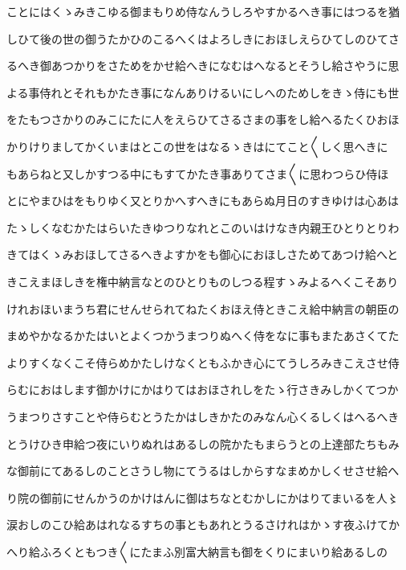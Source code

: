 \documentclass[a4paper,11pt,landscape]{ltjtarticle}
\begin{document}
\par\medskip
ことにはくゝみきこゆる御まもりめ侍なんうしろやすかるへき事にはつるを猶
\par\medskip
しひて後の世の御うたかひのこるへくはよろしきにおほしえらひてしのひてさ
\par\medskip
るへき御あつかりをさためをかせ給へきになむはへなるとそうし給さやうに思
\par\medskip
よる事侍れとそれもかたき事になんありけるいにしへのためしをきゝ侍にも世
\par\medskip
をたもつさかりのみこにたに人をえらひてさるさまの事をし給へるたくひおほ
\par\medskip
かりけりましてかくいまはとこの世をはなるゝきはにてこと〱しく思へきに
\par\medskip
もあらねと又しかすつる中にもすてかたき事ありてさま〱に思わつらひ侍ほ
\par\medskip
とにやまひはをもりゆく又とりかへすへきにもあらぬ月日のすきゆけは心あは
\par\medskip
たゝしくなむかたはらいたきゆつりなれとこのいはけなき内親王ひとりとりわ
\par\medskip
きてはくゝみおほしてさるへきよすかをも御心におほしさためてあつけ給へと
\par\medskip
きこえまほしきを権中納言なとのひとりものしつる程すゝみよるへくこそあり
\par\medskip
けれおほいまうち君にせんせられてねたくおほえ侍ときこえ給中納言の朝臣の
\par\medskip
まめやかなるかたはいとよくつかうまつりぬへく侍をなに事もまたあさくてた
\par\medskip
よりすくなくこそ侍らめかたしけなくともふかき心にてうしろみきこえさせ侍
\par\medskip
らむにおはします御かけにかはりてはおほされしをたゝ行さきみしかくてつか
\par\medskip
うまつりさすことや侍らむとうたかはしきかたのみなん心くるしくはへるへき
\par\medskip
とうけひき申給つ夜にいりぬれはあるしの院かたもまらうとの上達部たちもみ
\par\medskip
な御前にてあるしのことさうし物にてうるはしからすなまめかしくせさせ給へ
\par\medskip
り院の御前にせんかうのかけはんに御はちなとむかしにかはりてまいるを人〻
\par\medskip
涙おしのこひ給あはれなるすちの事ともあれとうるさけれはかゝす夜ふけてか
\par\medskip
へり給ふろくともつき〱にたまふ別富大納言も御をくりにまいり給あるしの
\par\medskip
\end{document}
